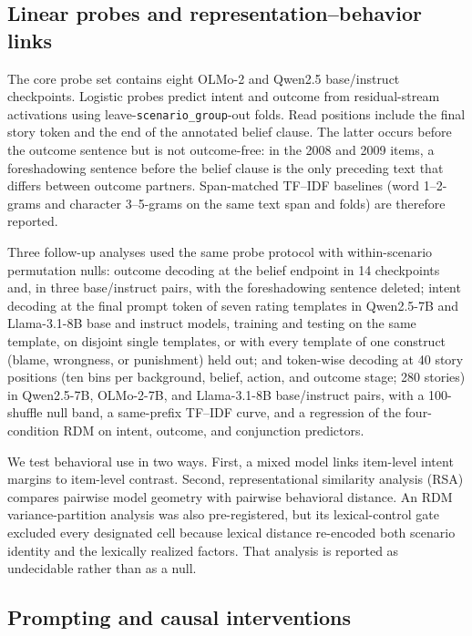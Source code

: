 \subsection{Linear probes and representation--behavior links}

The core probe set contains eight OLMo-2 and Qwen2.5 base/instruct checkpoints.
Logistic probes predict intent and outcome from residual-stream activations using leave-\texttt{scenario\_group}-out folds.
Read positions include the final story token and the end of the annotated belief clause.
The latter occurs before the outcome sentence but is not outcome-free: in the 2008 and 2009 items, a foreshadowing sentence before the belief clause is the only preceding text that differs between outcome partners.
Span-matched TF--IDF baselines (word 1--2-grams and character 3--5-grams on the same text span and folds) are therefore reported.

Three follow-up analyses used the same probe protocol with within-scenario permutation nulls: outcome decoding at the belief endpoint in 14 checkpoints and, in three base/instruct pairs, with the foreshadowing sentence deleted; intent decoding at the final prompt token of seven rating templates in Qwen2.5-7B and Llama-3.1-8B base and instruct models, training and testing on the same template, on disjoint single templates, or with every template of one construct (blame, wrongness, or punishment) held out; and token-wise decoding at 40 story positions (ten bins per background, belief, action, and outcome stage; 280 stories) in Qwen2.5-7B, OLMo-2-7B, and Llama-3.1-8B base/instruct pairs, with a 100-shuffle null band, a same-prefix TF--IDF curve, and a regression of the four-condition RDM on intent, outcome, and conjunction predictors.

We test behavioral use in two ways.
First, a mixed model links item-level intent margins to item-level contrast.
Second, representational similarity analysis (RSA) compares pairwise model geometry with pairwise behavioral distance.
An RDM variance-partition analysis was also pre-registered, but its lexical-control gate excluded every designated cell because lexical distance re-encoded both scenario identity and the lexically realized factors.
That analysis is reported as undecidable rather than as a null.

\subsection{Prompting and causal interventions}

